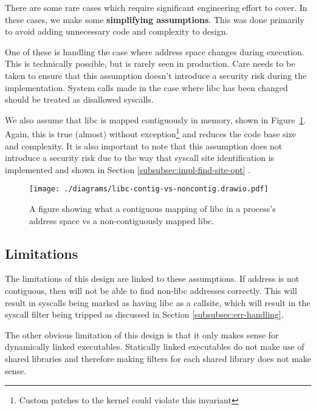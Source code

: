 There are some rare cases which require significant engineering effort to cover.
In these cases, we make some \textbf{simplifying assumptions}. This was done
primarily to avoid adding unnecessary code and complexity to \afg design. 
 
One of these is handling the case where  address space changes during
execution. This is technically possible, but is rarely seen in production.
Care needs to be taken to ensure that this assumption doesn't introduce a
security risk during the implementation. System calls made in the case where 
\ac{libc} has been changed should be treated as disallowed syscalls.


We also assume that \ac{libc} is mapped contiguously in memory, shown in
Figure~\ref{fig:libc-contiguous}. Again, this is
true (almost) without exception\footnote{Custom patches to the kernel could
violate this invariant} and reduces the code base size and complexity.
It is also important to note that this assumption does not introduce a security
risk due to the way that syscall site identification is implemented and shown in
Section \ref{subsubsec:impl-find-site-opt} \cite{glibc-dl-map-segments-h}.

\begin{figure}[ht]
    \centering
    \texttt{[image: ./diagrams/libc-contig-vs-noncontig.drawio.pdf]} 
    \caption{A figure showing what a contiguous mapping of \ac{libc} in a
    process's address space vs a non-contiguously mapped \ac{libc}.}
    \label{fig:libc-contiguous}
\end{figure}

\subsection{Limitations}

The limitations of this design are linked to these assumptions. If 
address is not contiguous, then \af will not be able to find non-\ac{libc}
addresses correctly. This will result in syscalls being marked as having 
\ac{libc} as a callsite, which will result in the syscall filter being
tripped as discussed in Section \ref{subsubsec:err-handling}. 

The other obvious limitation of this design is that it only makes sense for
dynamically linked executables. Statically linked executables do not make use of
shared libraries and therefore making filters for each shared library does not
make sense.

